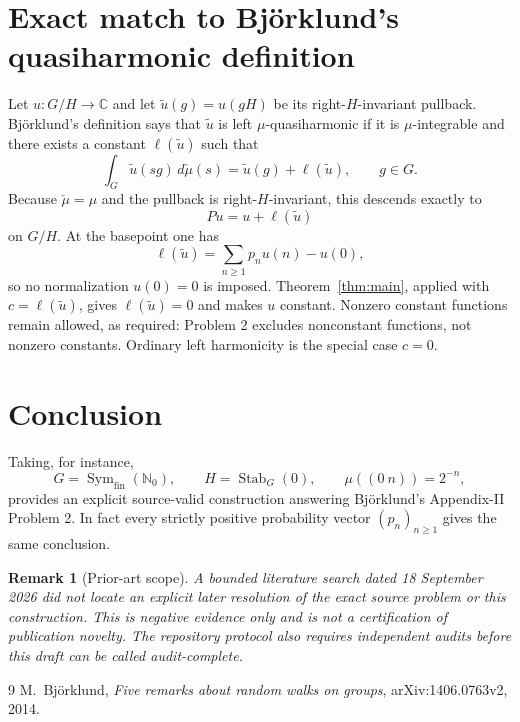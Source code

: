\documentclass[11pt]{article}
\newtheorem{remark}{Remark}
\begin{document}
\section{Exact match to Bj\"orklund's quasiharmonic definition}
Let $u:G/H\to\mathbb C$ and let $\widetilde u(g)=u(gH)$ be its right-$H$-invariant pullback. Bj\"orklund's definition says that $\widetilde u$ is left $\mu$-quasiharmonic if it is $\mu$-integrable and there exists a constant $\ell(\widetilde u)$ such that
\[
\int_G\widetilde u(sg)\,d\check\mu(s)
=
\widetilde u(g)+\ell(\widetilde u),\qquad g\in G.
\]
Because $\check\mu=\mu$ and the pullback is right-$H$-invariant, this descends exactly to
\[
Pu=u+\ell(\widetilde u)
\]
on $G/H$. At the basepoint one has
\[
\ell(\widetilde u)=\sum_{n\ge1}p_nu(n)-u(0),
\]
so no normalization $u(0)=0$ is imposed. Theorem~\ref{thm:main}, applied with $c=\ell(\widetilde u)$, gives $\ell(\widetilde u)=0$ and makes $u$ constant. Nonzero constant functions remain allowed, as required: Problem 2 excludes nonconstant functions, not nonzero constants. Ordinary left harmonicity is the special case $c=0$.

\section{Conclusion}
Taking, for instance,
\[
G=\operatorname{Sym}_{\mathrm{fin}}(\mathbb N_0),\qquad
H=\operatorname{Stab}_G(0),\qquad
\mu((0\ n))=2^{-n},
\]
provides an explicit source-valid construction answering Bj\"orklund's Appendix-II Problem 2. In fact every strictly positive probability vector $(p_n)_{n\ge1}$ gives the same conclusion.

\begin{remark}[Prior-art scope]
A bounded literature search dated 18 September 2026 did not locate an explicit later resolution of the exact source problem or this construction. This is negative evidence only and is not a certification of publication novelty. The repository protocol also requires independent audits before this draft can be called audit-complete.
\end{remark}

\begin{thebibliography}{9}
M.~Bj\"orklund,
\emph{Five remarks about random walks on groups},
arXiv:1406.0763v2, 2014.
\end{thebibliography}
\end{document}
